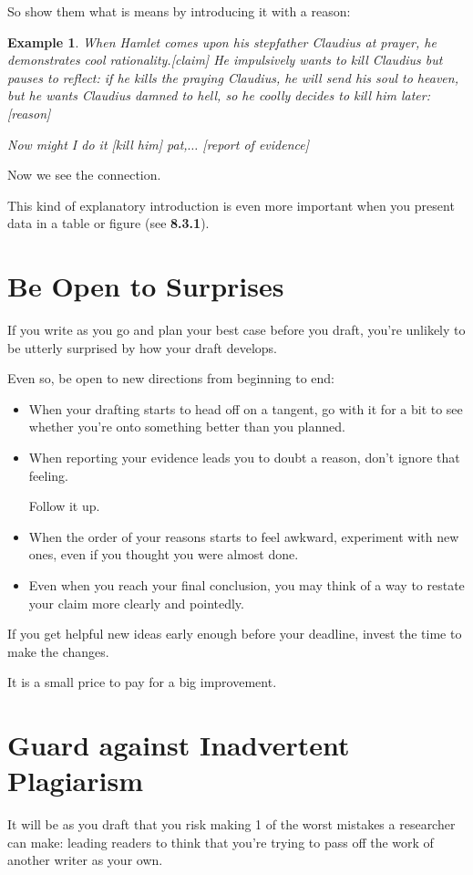 \documentclass[oneside]{book}
\numberwithin{equation}{section}
\newtheorem{example}{Example}[section]
\begin{document}
So show them what is means by introducing it with a reason:
\begin{example}
    When Hamlet comes upon his stepfather Claudius at prayer, he demonstrates cool rationality.\emph{[claim]} He impulsively wants to kill Claudius but pauses to reflect: if he kills the praying Claudius, he will send his soul to heaven, but he wants Claudius damned to hell, so he coolly decides to kill him later:\emph{[reason]}
    
    Now might I do it [kill him] pat,$\ldots$ \emph{[report of evidence]}
\end{example}
Now we see the connection.

This kind of explanatory introduction is even more important when you present data in a table or figure (see \textbf{8.3.1}).

\section{Be Open to Surprises}
If you write as you go and plan your best case before you draft, you're unlikely to be utterly surprised by how your draft develops.

Even so, be open to new directions from beginning to end:
\begin{itemize}
    \item When your drafting starts to head off on a tangent, go with it for a bit to see whether you're onto something better than you planned.
    \item When reporting your evidence leads you to doubt a reason, don't ignore that feeling.
    
    Follow it up.
    \item When the order of your reasons starts to feel awkward, experiment with new ones, even if you thought you were almost done.
    \item Even when you reach your final conclusion, you may think of a way to restate your claim more clearly and pointedly.
\end{itemize}
If you get helpful new ideas early enough before your deadline, invest the time to make the changes.

It is a small price to pay for a big improvement.

\section{Guard against Inadvertent Plagiarism}
It will be as you draft that you risk making 1 of the worst mistakes a researcher can make: leading readers to think that you're trying to pass off the work of another writer as your own.
\end{document}
